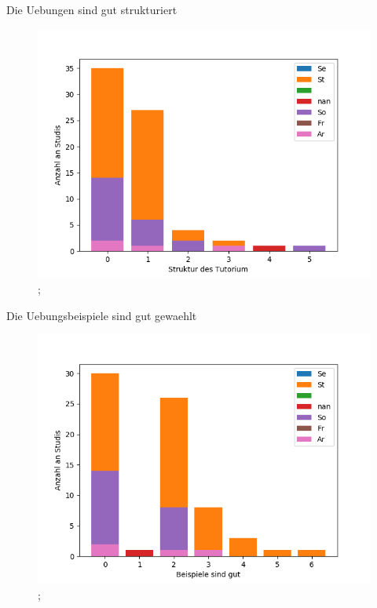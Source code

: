 \documentclass[10pt]{beamer}
\begin{document}
\begin{frame}[fragile]{Die Uebungen sind gut strukturiert} 
 \begin{figure}
 \includegraphics[width= 0.9\linewidth]{./PDFcreater/Plots/SolidEdge/Die+Uebungen+sind+gut+strukturiert.png};
 \end{figure}
 \end{frame}
\begin{frame}[fragile]{Die Uebungsbeispiele sind gut gewaehlt} 
 \begin{figure}
 \includegraphics[width= 0.9\linewidth]{./PDFcreater/Plots/SolidEdge/Die+Uebungsbeispiele+sind+gut+gewaehlt.png};
 \end{figure}
 \end{frame}
\end{document}
